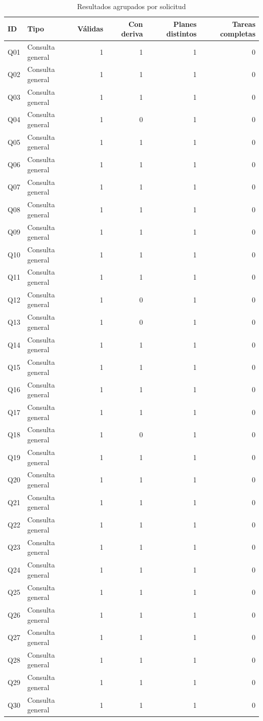 \begin{table}[!t]
\caption{Resultados agrupados por solicitud}
\label{tab:multi_cases}
\centering\footnotesize
\begin{tabular*}{\textwidth}{@{\extracolsep{\fill}}llrrrr}
\hline
ID & Tipo & Válidas & Con deriva & Planes distintos & Tareas completas\\
\hline
Q01 & Consulta general & 1 & 1 & 1 & 0\\
Q02 & Consulta general & 1 & 1 & 1 & 0\\
Q03 & Consulta general & 1 & 1 & 1 & 0\\
Q04 & Consulta general & 1 & 0 & 1 & 0\\
Q05 & Consulta general & 1 & 1 & 1 & 0\\
Q06 & Consulta general & 1 & 1 & 1 & 0\\
Q07 & Consulta general & 1 & 1 & 1 & 0\\
Q08 & Consulta general & 1 & 1 & 1 & 0\\
Q09 & Consulta general & 1 & 1 & 1 & 0\\
Q10 & Consulta general & 1 & 1 & 1 & 0\\
Q11 & Consulta general & 1 & 1 & 1 & 0\\
Q12 & Consulta general & 1 & 0 & 1 & 0\\
Q13 & Consulta general & 1 & 0 & 1 & 0\\
Q14 & Consulta general & 1 & 1 & 1 & 0\\
Q15 & Consulta general & 1 & 1 & 1 & 0\\
Q16 & Consulta general & 1 & 1 & 1 & 0\\
Q17 & Consulta general & 1 & 1 & 1 & 0\\
Q18 & Consulta general & 1 & 0 & 1 & 0\\
Q19 & Consulta general & 1 & 1 & 1 & 0\\
Q20 & Consulta general & 1 & 1 & 1 & 0\\
Q21 & Consulta general & 1 & 1 & 1 & 0\\
Q22 & Consulta general & 1 & 1 & 1 & 0\\
Q23 & Consulta general & 1 & 1 & 1 & 0\\
Q24 & Consulta general & 1 & 1 & 1 & 0\\
Q25 & Consulta general & 1 & 1 & 1 & 0\\
Q26 & Consulta general & 1 & 1 & 1 & 0\\
Q27 & Consulta general & 1 & 1 & 1 & 0\\
Q28 & Consulta general & 1 & 1 & 1 & 0\\
Q29 & Consulta general & 1 & 1 & 1 & 0\\
Q30 & Consulta general & 1 & 1 & 1 & 0\\
\hline
\end{tabular*}
\end{table}
